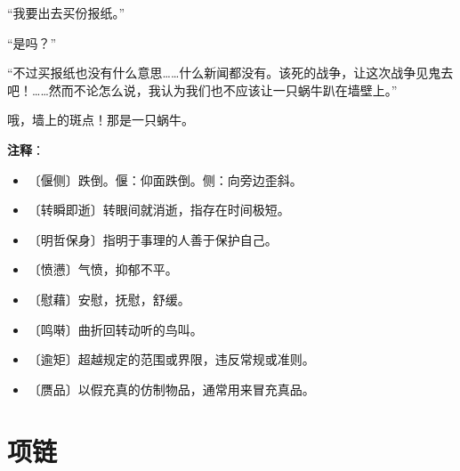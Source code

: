 \documentclass[12pt,UTF-8,openany]{ctexbook}
\begin{document}
\begin{normalsize}
    “我要出去买份报纸。”
    
    “是吗？”
    
    “不过买报纸也没有什么意思……什么新闻都没有。该死的战争，让这次战争见鬼去吧！……然而不论怎么说，我认为我们也不应该让一只蜗牛趴在墙壁上。”
    
    哦，墙上的斑点！那是一只蜗牛。
    
\end{normalsize}


\newpage

\textbf{注释}：

\vspace{-1em}

\begin{itemize}
    \setlength\itemsep{-0.2em}
    \item 〔偃侧〕跌倒。偃：仰面跌倒。侧：向旁边歪斜。
    \item 〔转瞬即逝〕转眼间就消逝，指存在时间极短。
    \item 〔明哲保身〕指明于事理的人善于保护自己。
    \item 〔愤懑〕气愤，抑郁不平。
    \item 〔慰藉〕安慰，抚慰，舒缓。
    \item 〔鸣啭〕曲折回转动听的鸟叫。
    \item 〔逾矩〕超越规定的范围或界限，违反常规或准则。
    \item 〔赝品〕以假充真的仿制物品，通常用来冒充真品。
\end{itemize}

\chapter{项链}
\end{document}
